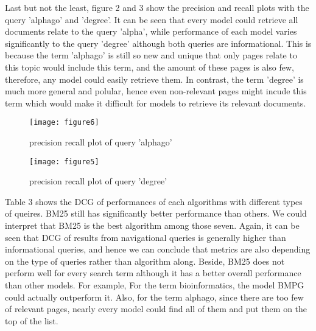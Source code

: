 Last but not the least, figure 2 and 3 show the precision and recall plots with the query 'alphago' and 'degree'. It can be seen that every model could retrieve all documents relate to the query 'alpha', while performance of each model varies significantly to the query 'degree' although both queries are informational. This is because the term 'alphago' is still so new and unique that only pages relate to this topic would include this term, and the amount of these pages is also few, therefore, any model could easily retrieve them. In contrast, the term 'degree' is much more general and polular, hence even non-relevant pages might incude this term which would make it difficult for models to retrieve its relevant documents.
\begin{figure}
\centering
\texttt{[image: figure6]}
\caption{precision recall plot of query 'alphago'}
\vskip -6pt
\end{figure}

\begin{figure}
\centering
\texttt{[image: figure5]}
\caption{precision recall plot of query 'degree'}
\vskip -6pt
\end{figure}

Table 3 shows the DCG of performances of each algorithms with different types of queires. BM25 still has significantly better performance than others. We could interpret that BM25 is the best algorithm among those seven. Again, it can be seen that DCG of results from navigational queries is generally higher than informational queries, and hence we can conclude that metrics are also depending on the type of queries rather than algorithm along. Beside, BM25 does not perform well for every search term although it has a better overall performance than other models. For example, For the term bioinformatics, the model BMPG could actually outperform it. Also, for the term alphago, since there are too few of relevant pages, nearly every model could find all of them and put them on the top of the list. 


\begin{table}[H]
\centering
\caption{DCG of models}
\label{my-label}
\end{table}


